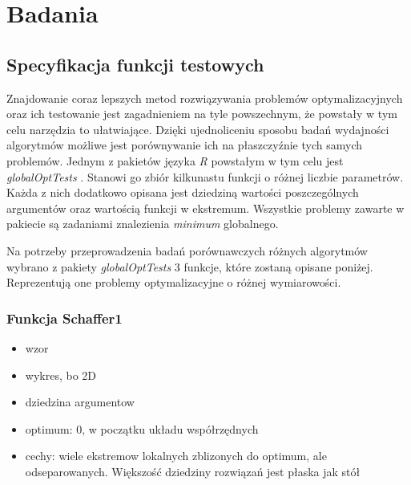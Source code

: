 \newpage
\chapter{Badania}


\section{Specyfikacja funkcji testowych}
Znajdowanie coraz lepszych metod rozwiązywania problemów optymalizacyjnych oraz ich testowanie jest zagadnieniem na tyle powszechnym, że powstały w tym celu narzędzia to ułatwiające. Dzięki ujednoliceniu sposobu badań wydajności algorytmów możliwe jest porównywanie ich na płaszczyźnie tych samych problemów. Jednym z pakietów języka \emph{R} powstałym w tym celu jest \emph{globalOptTests} \cite{globalOptTestsPackage}. Stanowi go zbiór kilkunastu funkcji o różnej liczbie parametrów. Każda z nich dodatkowo opisana jest dziedziną wartości poszczególnych argumentów oraz wartością funkcji w ekstremum. Wszystkie problemy zawarte w pakiecie są zadaniami znalezienia \emph{minimum} globalnego.
\par
Na potrzeby przeprowadzenia badań porównawczych różnych algorytmów wybrano z pakiety \emph{globalOptTests} 3 funkcje, które zostaną opisane poniżej. Reprezentują one problemy  optymalizacyjne o różnej wymiarowości. 
\subsection{Funkcja Schaffer1}
\begin{itemize}
\item wzor
\item wykres, bo 2D
\item dziedzina argumentow
\item optimum: 0, w początku układu współrzędnych
\item cechy: wiele ekstremow lokalnych zblizonych do optimum, ale odseparowanych. Większość dziedziny rozwiązań jest płaska jak stół 
\end{itemize}
